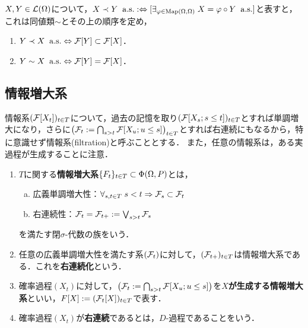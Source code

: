 \documentclass[uplatex,dvipdfmx]{jsreport}
\begin{document}
\begin{theorem}
    $X,Y\in\mathcal{L}(\Omega)$について，$X\prec Y\;\;\mathrm{a.s.}:\Leftrightarrow [\exists_{\varphi\in\mathrm{Map}(\Omega,\Omega)}\;X=\varphi\circ Y\;\;\mathrm{a.s.}]$と表すと，これは同値類$\sim$とその上の順序を定め，
    \begin{enumerate}
        \item $Y\prec X\;\;\mathrm{a.s.}\Leftrightarrow\mathcal{F}[Y]\subset\mathcal{F}[X]$．
        \item $Y\sim X\;\;\mathrm{a.s.}\Leftrightarrow\mathcal{F}[Y]=\mathcal{F}[X]$．
    \end{enumerate}
\end{theorem}

\subsection{情報増大系}

\begin{tcolorbox}[colframe=ForestGreen, colback=ForestGreen!10!white,breakable,colbacktitle=ForestGreen!40!white,coltitle=black,fonttitle=\bfseries\sffamily,
title=]
    情報系$(\mathcal{F}[X_t])_{t\in T}$について，過去の記憶を取り$(\mathcal{F}[X_s;s\le t])_{t\in T}$とすれば単調増大になり，さらに$\left(\mathcal{F}_t:=\bigcap_{s>t}\mathcal{F}[X_u;u\le s]\right)_{t\in T}$とすれば右連続にもなるから，特に意識せず情報系(filtration)と呼ぶこととする．
    また，任意の情報系は，ある実過程が生成することに注意．
\end{tcolorbox}

\begin{definition}[filtration]\mbox{}
    \begin{enumerate}
        \item $T$に関する\textbf{情報増大系}$\{F_t\}_{t\in T}\subset\Phi(\Omega,P)$とは，
        \begin{enumerate}[(a)]
            \item 広義単調増大性：$\forall_{s,t\in T}\;s<t\Rightarrow\mathcal{F}_s\subset\mathcal{F}_t$
            \item 右連続性：$\mathcal{F}_t=\mathcal{F}_{t+}:=\bigvee_{s>t}\mathcal{F}_s$
        \end{enumerate}
        を満たす閉$\sigma$-代数の族をいう．
        \item 任意の広義単調増大性を満たす系$(\mathcal{F}_t)$に対して，$(\mathcal{F}_{t+})_{t\in T}$は情報増大系である．これを\textbf{右連続化}という．
        \item 確率過程$(X_t)$に対して，$\left(\mathcal{F}_t:=\bigcap_{s>t}\mathcal{F}[X_u;u\le s]\right)$を\textbf{$X$が生成する情報増大系}といい，$F[X]:=(\mathcal{F}_t[X])_{t\in T}$で表す．
        \item 確率過程$(X_t)$が\textbf{右連続}であるとは，$D$-過程であることをいう．
    \end{enumerate}
\end{definition}
\end{document}
